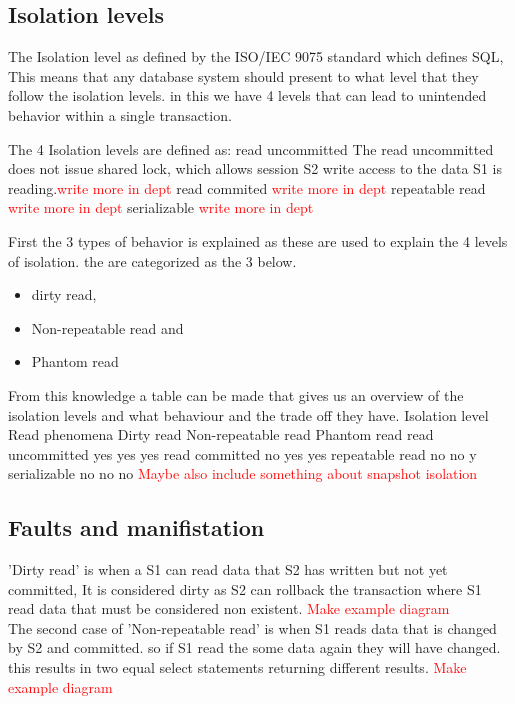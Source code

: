 \documentclass[a4paper,10pt,titlepage]{report}
\begin{document}
\subsection{Isolation levels}

The Isolation level as defined by the ISO/IEC 9075 standard which defines SQL, This means that any database system should present to what level that they follow the isolation levels. in this we have 4 levels that can lead to unintended behavior within a single transaction.

The 4 Isolation levels are defined as:
read uncommitted
       The read uncommitted does not issue shared lock, which allows session S2 write access to the data S1 is reading.\textcolor{red}{write more in dept}
 read commited
 \textcolor{red}{write more in dept}
repeatable read
\textcolor{red}{write more in dept}
serializable
\textcolor{red}{write more in dept}



First the 3 types of behavior is explained as these are used to explain the 4 levels of isolation. the are categorized as the 3 below.
\begin{itemize}
\item dirty read,
\item Non-repeatable read and
\item Phantom read
\end{itemize}

From this knowledge a table can be made that gives us an overview of the isolation levels and what behaviour and the trade off they have.
Isolation level	Read phenomena
Dirty read	Non-repeatable read	Phantom read
read uncommitted	yes	yes	yes
read committed	no	yes	yes
repeatable read	no	no	y
serializable	no	no	no
\textcolor{red}{Maybe also include something about snapshot isolation}

\subsection{Faults and manifistation}

'Dirty read' is when a S1 can read data that S2 has written but not yet committed, It is considered dirty as S2 can rollback the transaction where S1 read data that must be considered non existent. \textcolor{red}{Make example diagram}
\\
The second case of 'Non-repeatable read' is when S1 reads data that is changed by S2 and committed. so if S1 read the some data again they will have changed. this results in two equal select statements returning different results.  \textcolor{red}{Make example diagram}
\end{document}
